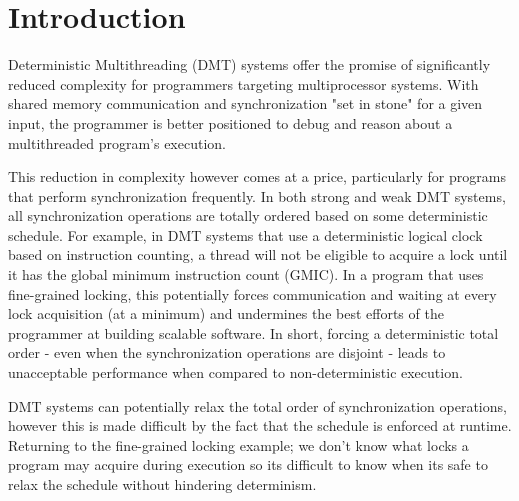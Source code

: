\section{Introduction}


Deterministic Multithreading (DMT) systems offer the promise of significantly reduced complexity for programmers targeting multiprocessor systems. With shared memory communication and synchronization "set in stone" for a given input, the programmer is better positioned to debug and reason about a multithreaded program's execution. 

This reduction in complexity however comes at a price, particularly for programs that perform synchronization frequently. In both strong and weak DMT systems, all synchronization operations are totally ordered based on some deterministic schedule. For example, in DMT systems that use a deterministic logical clock based on instruction counting, a thread will not be eligible to acquire a lock until it has the global minimum instruction count (GMIC). In a program that uses fine-grained locking, this potentially forces communication and waiting at every lock acquisition (at a minimum)  and undermines the best efforts of the programmer at building scalable software. In short, forcing a deterministic total order - even when the synchronization operations are disjoint - leads to unacceptable performance when compared to non-deterministic execution.

DMT systems can potentially relax the total order of synchronization operations, however this is made difficult by the fact that the schedule is enforced at runtime. Returning to the fine-grained locking example; we don't know what locks a program may acquire during execution so its difficult to know when its safe to relax the schedule without hindering determinism.  
